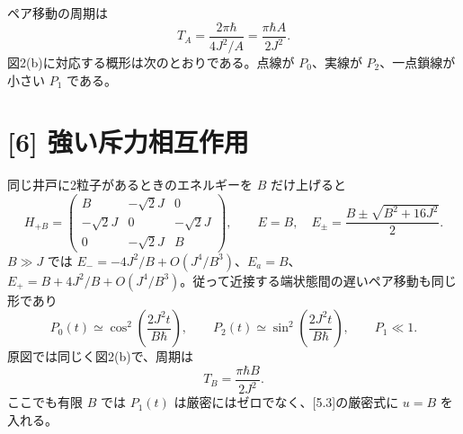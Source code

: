 \documentclass[11pt,a4paper]{article}
\begin{document}
ペア移動の周期は
\begin{equation}
 \boxed{T_A=\frac{2\pi\hbar}{4J^2/A}=\frac{\pi\hbar A}{2J^2}}.
\end{equation}
図2(b)に対応する概形は次のとおりである。点線が $P_0$、実線が $P_2$、一点鎖線が小さい $P_1$ である。
\begin{center}
\end{center}
\section*{[6] 強い斥力相互作用}
同じ井戸に2粒子があるときのエネルギーを $B$ だけ上げると
\begin{equation}
 H_{+B}=\begin{pmatrix}
 B&-\sqrt2J&0\\-\sqrt2J&0&-\sqrt2J\\0&-\sqrt2J&B
 \end{pmatrix},\qquad
 E=B,\quad E_\pm=\frac{B\pm\sqrt{B^2+16J^2}}2.
\end{equation}
$B\gg J$ では $E_-= -4J^2/B+O(J^4/B^3)$、$E_a=B$、$E_+=B+4J^2/B+O(J^4/B^3)$。従って近接する端状態間の遅いペア移動も同じ形であり
\begin{equation}
 P_0(t)\simeq\cos^2\!\left(\frac{2J^2t}{B\hbar}\right),\qquad
 P_2(t)\simeq\sin^2\!\left(\frac{2J^2t}{B\hbar}\right),\qquad P_1\ll1.
\end{equation}
原図では同じく図2(b)で、周期は
\begin{equation}
 \boxed{T_B=\frac{\pi\hbar B}{2J^2}}.
\end{equation}
ここでも有限 $B$ では $P_1(t)$ は厳密にはゼロでなく、[5.3]の厳密式に $u=B$ を入れる。
\end{document}
